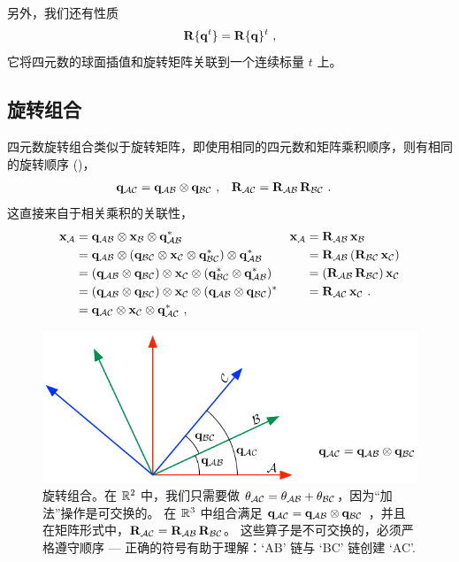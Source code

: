 另外，我们还有性质%
%
\begin{align}
\bfR\{\bfq^t\}=\bfR\{\bfq\}^t
~,
\end{align}
%
它将四元数的球面插值和旋转矩阵关联到一个连续标量 $t$ 上。


\subsection{旋转组合}

四元数旋转组合类似于旋转矩阵，即使用相同的四元数和矩阵乘积顺序，则有相同的旋转顺序 ()，
%
\begin{align}
\bfq_{\cA\cC} &= \bfq_{\cA\cB}\ot\bfq_{\cB\cC} ~,
&
\bfR_{\cA\cC} &= \bfR_{\cA\cB}\,\bfR_{\cB\cC} ~.\label{equ:rotComposition}
\end{align}%
%
%
%
这直接来自于相关乘积的关联性，
%
\begin{align*}
\bfx_\cA 
&= \bfq_{\cA\cB}\ot\bfx_\cB\ot\bfq_{\cA\cB}^* 
& \bfx_\cA
&= \bfR_{\cA\cB}\,\bfx_\cB
\\
&= \bfq_{\cA\cB}\ot(\bfq_{\cB\cC}\ot\bfx_\cC\ot\bfq_{\cB\cC}^*)\ot\bfq_{\cA\cB}^* 
&&= \bfR_{\cA\cB}\,(\bfR_{\cB\cC}\,\bfx_\cC) 
\\
&= (\bfq_{\cA\cB}\ot\bfq_{\cB\cC})\ot\bfx_\cC\ot(\bfq_{\cB\cC}^*\ot\bfq_{\cA\cB}^*) 
&&= (\bfR_{\cA\cB}\,\bfR_{\cB\cC})\,\bfx_\cC 
\\
&= (\bfq_{\cA\cB}\ot\bfq_{\cB\cC})\ot\bfx_\cC\ot(\bfq_{\cA\cB}\ot\bfq_{\cB\cC})^* 
&&= \bfR_{\cA\cC}\,\bfx_\cC ~.
\\
&= \bfq_{\cA\cC}\ot\bfx_\cC\ot\bfq_{\cA\cC}^* 
~,
\end{align*}

\begin{figure}[htbp]
\begin{center}
\includegraphics{figures/composition}
\caption{旋转组合。在 $\bbR^2$ 中，我们只需要做 $\theta_{\cA\cC} = \theta_{\cA\cB}+\theta_{\cB\cC}$，因为“加法”操作是可交换的。 
在 $\bbR^3$ 中组合满足 $\bfq_{\cA\cC} = \bfq_{\cA\cB}\ot\bfq_{\cB\cC}$ ，并且在矩阵形式中，$\bfR_{\cA\cC} = \bfR_{\cA\cB}\,\bfR_{\cB\cC}$。
这些算子是不可交换的，必须严格遵守顺序 --- 正确的符号有助于理解：`AB' 链与 `BC' 链创建 `AC'.}
\label{fig:composition}
\end{center}
\end{figure}
%

